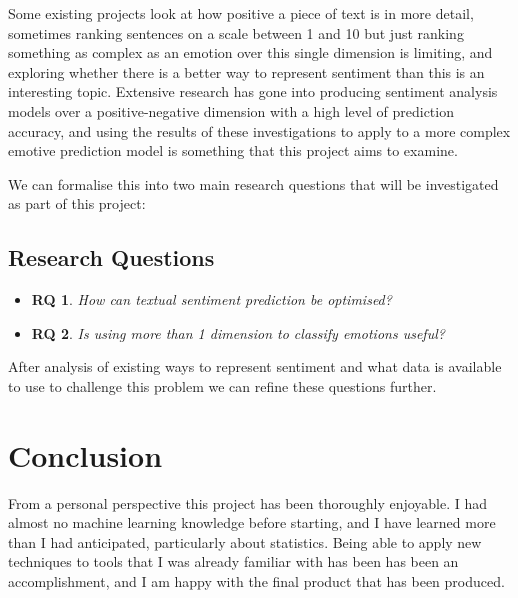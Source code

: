 \documentclass[11pt]{article}
\newtheorem{theorem}{RQ}
\begin{document}
Some existing projects look at how positive a piece of text is in more detail, sometimes ranking sentences on a scale between 1 and 10 but just ranking something as complex as an emotion over this single dimension is limiting, and exploring whether there is a better way to represent sentiment than this is an interesting topic.
Extensive research has gone into producing sentiment analysis models over a positive-negative dimension with a high level of prediction accuracy, and using the results of these investigations to apply to a more complex emotive prediction model is something that this project aims to examine.

We can formalise this into two main research questions that will be investigated as part of this project:

\subsection{Research Questions}


\begin{itemize}
    \item   \begin{theorem} 
                \label{RQ1}
                \textnormal{How can textual sentiment prediction be optimised?}
            \end{theorem}   
    \item   \begin{theorem} 
                \label{RQ2}
                \textnormal{Is using more than 1 dimension to classify emotions useful?}
            \end{theorem} 
\end{itemize}

After analysis of existing ways to represent sentiment and what data is available to use to challenge this problem we can refine these questions further. 


\pagebreak


\section{Conclusion}

From a personal perspective this project has been thoroughly enjoyable. I had almost no machine learning knowledge before starting, and I have learned more than I had anticipated, particularly about statistics. Being able to apply new techniques to tools that I was already familiar with has been has been an accomplishment, and I am happy with the final product that has been produced. 
\end{document}
